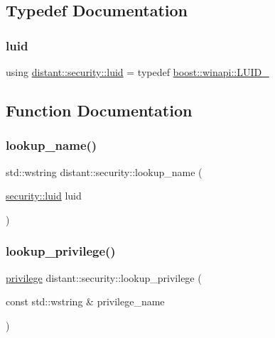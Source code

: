 \subsection{Typedef Documentation}
\mbox{\label{namespacedistant_1_1security_a67e703359629612133171032e9beecce}} 
\subsubsection{\texorpdfstring{luid}{luid}}
{\footnotesize\ttfamily using \mbox{\hyperlink{namespacedistant_1_1security_a67e703359629612133171032e9beecce}{distant\+::security\+::luid}} = typedef \mbox{\hyperlink{namespaceboost_1_1winapi_aeabc0bea0a606e83e4fab8767dfc38db}{boost\+::winapi\+::\+L\+U\+I\+D\+\_\+}}}



\subsection{Function Documentation}
\mbox{\label{namespacedistant_1_1security_a9f354d6ecb666413f3f210ce22ef5497}} 
\subsubsection{\texorpdfstring{lookup\+\_\+name()}{lookup\_name()}}
{\footnotesize\ttfamily std\+::wstring distant\+::security\+::lookup\+\_\+name (\begin{DoxyParamCaption}\item[{\mbox{\hyperlink{namespacedistant_1_1security_a67e703359629612133171032e9beecce}{security\+::luid}}}]{luid }\end{DoxyParamCaption})\hspace{0.3cm}{\ttfamily [inline]}}

\mbox{\label{namespacedistant_1_1security_a50475ae37fdbf2555a3778e854facc5a}} 
\subsubsection{\texorpdfstring{lookup\+\_\+privilege()}{lookup\_privilege()}}
{\footnotesize\ttfamily \mbox{\hyperlink{classdistant_1_1security_1_1privilege}{privilege}} distant\+::security\+::lookup\+\_\+privilege (\begin{DoxyParamCaption}\item[{const std\+::wstring \&}]{privilege\+\_\+name }\end{DoxyParamCaption})\hspace{0.3cm}{\ttfamily [inline]}}

